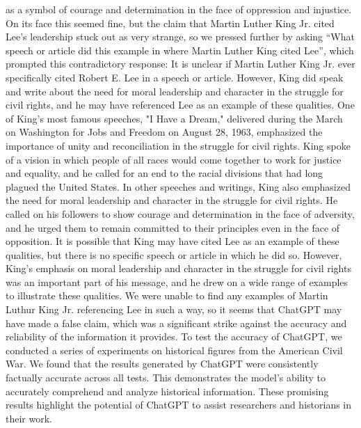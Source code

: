 \documentclass[letterpaper, 10 pt, conference]{ieeeconf}  %
\begin{document}
as a symbol of courage and determination in the face of oppression and injustice.
On its face this seemed fine, but the claim that Martin Luther King Jr. cited Lee’s leadership stuck out as very strange, so we
pressed further by asking “What speech or article did this example in where Martin Luther King cited Lee”, which prompted this
contradictory response:
It is unclear if Martin Luther King Jr. ever specifically cited Robert E. Lee in a speech or article. However, King did
speak and write about the need for moral leadership and character in the struggle for civil rights, and he may have
referenced Lee as an example of these qualities. One of King's most famous speeches, "I Have a Dream," delivered during
the March on Washington for Jobs and Freedom on August 28, 1963, emphasized the importance of unity and
reconciliation in the struggle for civil rights. King spoke of a vision in which people of all races would come together to
work for justice and equality, and he called for an end to the racial divisions that had long plagued the United States. In
other speeches and writings, King also emphasized the need for moral leadership and character in the struggle for civil
rights. He called on his followers to show courage and determination in the face of adversity, and he urged them to
remain committed to their principles even in the face of opposition. It is possible that King may have cited Lee as an
example of these qualities, but there is no specific speech or article in which he did so. However, King's emphasis on
moral leadership and character in the struggle for civil rights was an important part of his message, and he drew on a
wide range of examples to illustrate these qualities.
We were unable to find any examples of Martin Luthur King Jr. referencing Lee in such a way, so it seems that ChatGPT may have
made a false claim, which was a significant strike against the accuracy and reliability of the information it provides.
To test the accuracy of ChatGPT, we conducted a series of experiments on historical figures from the American Civil War. We
found that the results generated by ChatGPT were consistently factually accurate across all tests. This demonstrates the model's
ability to accurately comprehend and analyze historical information. These promising results highlight the potential of ChatGPT to
assist researchers and historians in their work.



   \begin{figure}[]
      \centering
      \caption{}
      \label{}
   \end{figure}
   
\end{document}
